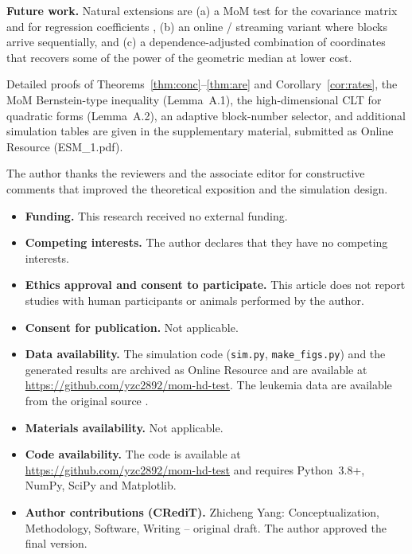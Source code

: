 \documentclass[pdflatex,sn-mathphys-num]{sn-jnl}
\theoremstyle{thmstyleone}%
\theoremstyle{thmstyletwo}%
\theoremstyle{thmstylethree}%
\begin{document}
\textbf{Future work.} Natural extensions are (a) a MoM test for the covariance
matrix and for regression coefficients \citep{zhong2011}, (b) an online /
streaming variant where blocks arrive sequentially, and (c) a dependence-adjusted
combination of coordinates that recovers some of the power of the geometric
median \citep{minsker2015} at lower cost.

\backmatter

Detailed proofs of Theorems~\ref{thm:conc}--\ref{thm:are} and
Corollary~\ref{cor:rates}, the MoM Bernstein-type inequality (Lemma~A.1), the
high-dimensional CLT for quadratic forms (Lemma~A.2), an adaptive block-number
selector, and additional simulation tables are given in the supplementary
material, submitted as Online Resource (ESM\_1.pdf).


The author thanks the reviewers and the associate editor for constructive
comments that improved the theoretical exposition and the simulation design.


\begin{itemize}
\item \textbf{Funding.} This research received no external funding.
\item \textbf{Competing interests.} The author declares that they have no competing interests.
\item \textbf{Ethics approval and consent to participate.} This article does not report studies with human participants or animals performed by the author.
\item \textbf{Consent for publication.} Not applicable.
\item \textbf{Data availability.} The simulation code (\texttt{sim.py}, \texttt{make\_figs.py}) and the generated results are archived as Online Resource and are available at \url{https://github.com/yzc2892/mom-hd-test}. The leukemia data are available from the original source \citep{golub1999}.
\item \textbf{Materials availability.} Not applicable.
\item \textbf{Code availability.} The code is available at \url{https://github.com/yzc2892/mom-hd-test} and requires Python~3.8+, NumPy, SciPy and Matplotlib.
\item \textbf{Author contributions (CRediT).} Zhicheng Yang: Conceptualization, Methodology, Software, Writing -- original draft. The author approved the final version.
\end{itemize}


\end{document}
